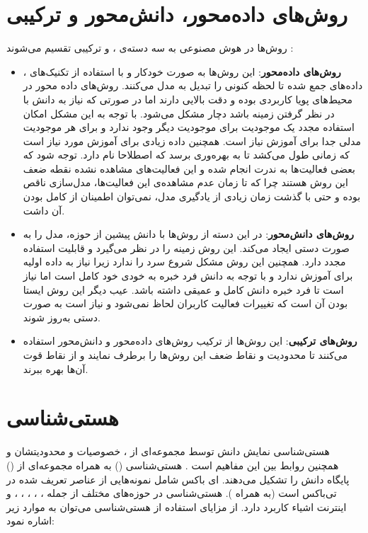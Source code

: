 \section{روش‌های داده‌محور، دانش‌محور و ترکیبی}\label{chapter:c22}

روش‌ها در هوش مصنوعی به سه دسته‌ی ،  و ترکیبی تقسیم می‌شوند \cite{x221,x222}:

\begin{itemize}
\item \textbf{روش‌های داده‌محور}: این روش‌ها به صورت خودکار و با استفاده از تکنیک‌های ، داده‌های جمع شده تا لحظه کنونی را تبدیل به مدل‌ می‌کنند. روش‌های داده محور در محیط‌های پویا کاربردی بوده و دقت بالایی دارند اما در صورتی که نیاز به دانش با در نظر گرفتن زمینه باشد دچار مشکل می‌شود. با توجه به این مشکل امکان استفاده مجدد یک موجودیت برای موجودیت دیگر وجود ندارد و برای هر موجودیت مدلی جدا برای آموزش نیاز است. همچنین داده زیادی برای آموزش مورد نیاز است که زمانی طول می‌کشد تا به بهره‌وری برسد که اصطلاحا  نام دارد. توجه شود که بعضی فعالیت‌ها به ندرت انجام شده و این فعالیت‌های مشاهده نشده نقطه ضعف این روش هستند چرا که تا زمان عدم مشاهده‌ی این فعالیت‌ها، مدل‌سازی ناقص بوده و حتی با گذشت زمان زیادی از یادگیری مدل، نمی‌توان اطمینان از کامل بودن آن داشت.
\item \textbf{روش‌های دانش‌محور}: در این دسته از روش‌ها  با دانش پیشین از حوزه، مدل را به صورت دستی ایجاد می‌کند. این روش زمینه را در نظر می‌گیرد و قابلیت استفاده مجدد دارد. همچنین این روش مشکل شروع سرد را ندارد زیرا نیاز به داده اولیه برای آموزش ندارد و با توجه به دانش فرد خبره به خودی خود کامل است اما نیاز است تا فرد خبره دانش کامل و عمیقی داشته باشد. عیب دیگر این روش ایستا بودن آن است که تغییرات فعالیت کاربران لحاظ نمی‌شود و نیاز است به صورت دستی به‌روز شوند.
\item \textbf{روش‌های ترکیبی}: این روش‌ها ‌از ترکیب روش‌های داده‌محور و دانش‌محور استفاده می‌کنند تا محدودیت و نقاط ضعف این روش‌ها را برطرف نمایند و از نقاط قوت آن‌ها بهره ببرند.
\end{itemize}

\section{هستی‌شناسی}

هستی‌شناسی نمایش  دانش توسط مجموعه‌ای از ، خصوصیات و محدودیتشان و همچنین روابط بین این مفاهیم است \cite{x231}. هستی‌شناسی () به همراه مجموعه‌ای از  () پایگاه دانش را تشکیل می‌دهند. ای باکس شامل نمونه‌هایی از عناصر تعریف شده در تی‌باکس است (به همراه ).
هستی‌شناسی در حوزه‌های مختلف از جمله ، ، ، ، ،  و اینترنت اشیاء کاربرد دارد. از مزایای استفاده از هستی‌شناسی می‌توان به موارد زیر اشاره نمود:

